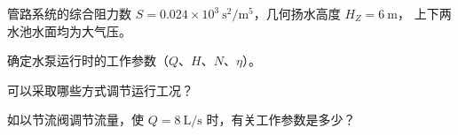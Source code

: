 \begin{ti}
管路系统的综合阻力数 $S=0.024\times10^{3}\ \mathrm{s^2/m^5}$，几何扬水高度 $H_Z=6\ \mathrm{m}$，
上下两水池水面均为大气压。
\begin{xiaowen}
\item 确定水泵运行时的工作参数（$Q$、$H$、$N$、$\eta$）。
\item 可以采取哪些方式调节运行工况？
\item 如以节流阀调节流量，使 $Q=8\ \mathrm{L/s}$ 时，有关工作参数是多少？
\end{xiaowen}

\end{ti}
